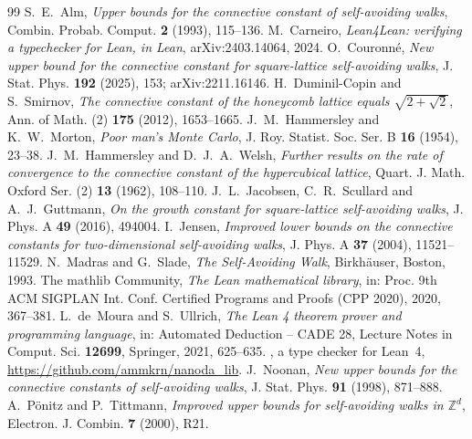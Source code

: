 \documentclass[11pt]{amsart}
\theoremstyle{definition}
\theoremstyle{remark}
\numberwithin{equation}{section}
\newcommand{\lean}[1]{\texttt{\detokenize{#1}}}
\newcommand{\Z}{\mathbb{Z}}
\begin{document}
\begin{thebibliography}{99}
 S.~E.~Alm, \emph{Upper bounds for the connective constant of self-avoiding walks}, Combin. Probab. Comput. \textbf{2} (1993), 115--136.
 M.~Carneiro, \emph{Lean4Lean: verifying a typechecker for Lean, in Lean}, arXiv:2403.14064, 2024.
 O.~Couronn\'e, \emph{New upper bound for the connective constant for square-lattice self-avoiding walks}, J. Stat. Phys. \textbf{192} (2025), 153; arXiv:2211.16146.
 H.~Duminil-Copin and S.~Smirnov, \emph{The connective constant of the honeycomb lattice equals $\sqrt{2+\sqrt2}$}, Ann. of Math. (2) \textbf{175} (2012), 1653--1665.
 J.~M.~Hammersley and K.~W.~Morton, \emph{Poor man's Monte Carlo}, J. Roy. Statist. Soc. Ser. B \textbf{16} (1954), 23--38.
 J.~M.~Hammersley and D.~J.~A.~Welsh, \emph{Further results on the rate of convergence to the connective constant of the hypercubical lattice}, Quart. J. Math. Oxford Ser. (2) \textbf{13} (1962), 108--110.
 J.~L.~Jacobsen, C.~R.~Scullard and A.~J.~Guttmann, \emph{On the growth constant for square-lattice self-avoiding walks}, J. Phys. A \textbf{49} (2016), 494004.
 I.~Jensen, \emph{Improved lower bounds on the connective constants for two-dimensional self-avoiding walks}, J. Phys. A \textbf{37} (2004), 11521--11529.
 N.~Madras and G.~Slade, \emph{The Self-Avoiding Walk}, Birkh\"auser, Boston, 1993.
 The mathlib Community, \emph{The Lean mathematical library}, in: Proc. 9th ACM SIGPLAN Int. Conf. Certified Programs and Proofs (CPP 2020), 2020, 367--381.
 L.~de~Moura and S.~Ullrich, \emph{The Lean 4 theorem prover and programming language}, in: Automated Deduction -- CADE 28, Lecture Notes in Comput. Sci. \textbf{12699}, Springer, 2021, 625--635.
 \lean{nanoda_lib}, a type checker for Lean~4, \url{https://github.com/ammkrn/nanoda_lib}.
 J.~Noonan, \emph{New upper bounds for the connective constants of self-avoiding walks}, J. Stat. Phys. \textbf{91} (1998), 871--888.
 A.~P\"onitz and P.~Tittmann, \emph{Improved upper bounds for self-avoiding walks in $\Z^d$}, Electron. J. Combin. \textbf{7} (2000), R21.
\end{thebibliography}
\end{document}
